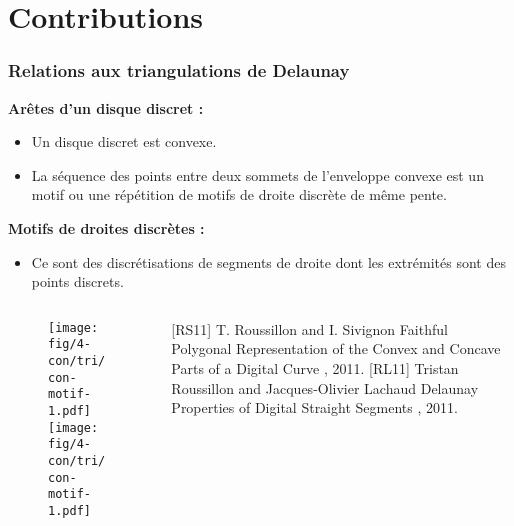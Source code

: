 \section{Contributions}

\begin{frame}
\frametitle{Relations aux triangulations de Delaunay}


{
  \begin{block}{}
    \textbf{Arêtes d'un disque discret :}\\
	  \begin{itemize}
      \item Un disque discret est convexe.
      \item La séquence des points entre deux sommets de l'enveloppe convexe est un motif ou une répétition de motifs de droite discrète de même pente.
    \end{itemize}
    
	  \textbf{Motifs de droites discrètes :}\\
	  \begin{itemize}
      \item Ce sont des discrétisations de segments de droite dont les extrémités sont des points discrets.
    \end{itemize}
  \end{block}

  \begin{columns}[t]
    \begin{column}{0.5\linewidth}
    	\begin{figure}[H]
	      \centering
	      \texttt{[image: fig/4-con/tri/con-motif-1.pdf]}
	      \texttt{[image: fig/4-con/tri/con-motif-1.pdf]}	      
	    \end{figure}

    \end{column}
    \begin{column}{0.5\linewidth}
      \begin{thebibliography}{alpha}
      \scriptsize
        [RS11] T. Roussillon and I. Sivignon
        \newblock Faithful Polygonal Representation of the Convex and Concave Parts of a Digital Curve
        , 2011.    
        [RL11] Tristan Roussillon and Jacques-Olivier Lachaud
        \newblock Delaunay Properties of Digital Straight Segments
        , 2011.
      \end{thebibliography}
      \scriptsize     
    \end{column}
  \end{columns}   
}


\end{frame}
